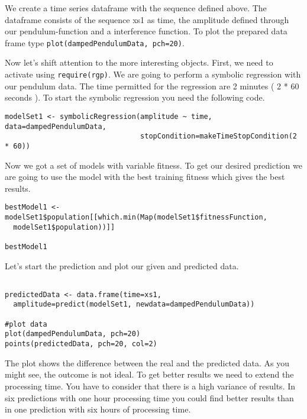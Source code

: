 We create a time series dataframe with the sequence defined above. 
The dataframe consists of the sequence xs1 as time, the amplitude defined through our pendulum-function and a
interference function.
To plot the prepared data frame type \lstinline!plot(dampedPendulumData, pch=20)!.

Now let's shift attention to the more interesting objects.
First, we need to activate \RGP using \lstinline!require(rgp)!.
We are going to perform a symbolic regression with our pendulum data.
The time permitted for the regression are 2 minutes ( 2 * 60 seconds ).
To start the symbolic regression you need the following code.

\begin{lstlisting}[caption = {Symbolic Regression }, label = tutsymbolicregression]
modelSet1 <- symbolicRegression(amplitude ~ time, data=dampedPendulumData,
                                stopCondition=makeTimeStopCondition(2 * 60))
\end{lstlisting}

Now we got a set of models with variable fitness. 
To get our desired prediction we are going to use the model with the best training fitness
which gives the best results.

\begin{lstlisting}[caption = {Best Model}, label = tutbestmodel]
bestModel1 <- modelSet1$population[[which.min(Map(modelSet1$fitnessFunction, 
  modelSet1$population))]]

bestModel1
\end{lstlisting}

Let's start the prediction and plot our given and predicted data. 

\begin{lstlisting}[caption = {Prediction}, label = tutPrediction]

predictedData <- data.frame(time=xs1,
  amplitude=predict(modelSet1, newdata=dampedPendulumData))

#plot data
plot(dampedPendulumData, pch=20)
points(predictedData, pch=20, col=2)

\end{lstlisting}



The plot shows the difference between the real and the predicted data. 
As you might see, the outcome is not ideal. To get better results we need to extend the processing time.
You have to consider that there is a high variance of results. In six predictions with one hour processing 
time you could find better results than in one prediction with six hours of processing time. 


